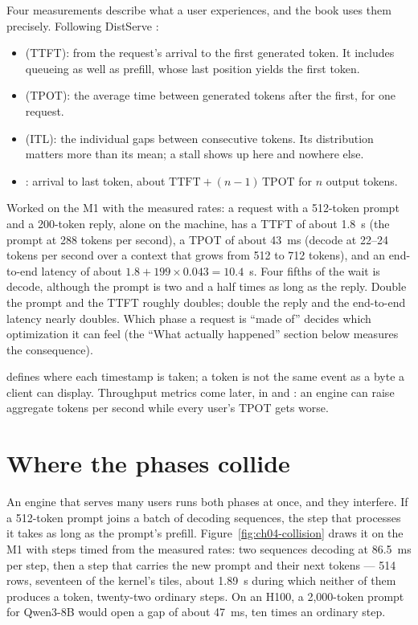 Four measurements describe what a user experiences, and the book uses them
precisely. Following DistServe \cite{zhong2024distserve}:

\begin{itemize}
\item {} (TTFT): from the request's arrival to the
first generated token. It includes queueing as well as prefill, whose last
position yields the first token.
\item {} (TPOT): the average time between generated
tokens after the first, for one request.
\item {} (ITL): the individual gaps between
consecutive tokens. Its distribution matters more than its mean; a stall
shows up here and nowhere else.
\item {}: arrival to last token, about
$\text{TTFT}+(n-1)\,\text{TPOT}$ for $n$ output tokens.
\end{itemize}

Worked on the M1 with the measured rates: a request with a 512-token prompt
and a 200-token reply, alone on the machine, has a TTFT of about 1.8~s (the
prompt at 288 tokens per second), a TPOT of about 43~ms (decode at 22--24 tokens
per second over a context that grows from 512 to 712 tokens), and an
end-to-end latency of about $1.8 + 199 \times 0.043 = 10.4$~s. Four fifths of
the wait is decode, although the prompt is two and a half times as long as the
reply. Double the prompt and the TTFT roughly doubles; double the reply and the
end-to-end latency nearly doubles. Which phase a request is ``made of'' decides
which optimization it can feel (the ``What actually happened'' section below
measures the consequence).

 defines where each timestamp is taken; a token is
not the same event as a byte a client can display. Throughput metrics come
later, in  and : an engine can raise
aggregate tokens per second while every user's TPOT gets worse.

\section{Where the phases collide}

An engine that serves many users runs both phases at once, and they interfere.
If a 512-token prompt joins a batch of decoding sequences, the step that
processes it takes as long as the prompt's prefill. Figure~\ref{fig:ch04-collision}
draws it on the M1 with steps timed from the measured rates: two sequences
decoding at 86.5~ms per step, then a step that carries the new prompt and their
next tokens --- 514 rows, seventeen of the kernel's tiles, about 1.89~s during
which neither of them produces a token, twenty-two ordinary steps. On an H100, a 2,000-token prompt for Qwen3-8B would open a gap
of about 47~ms, ten times an ordinary step.

